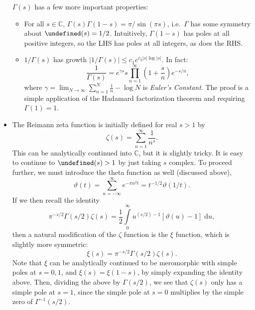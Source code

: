 \documentclass[11pt,
        usenames, %
        dvipsnames %
    ]{report}
\newcommand*{\abs}[1]{\left|#1\right|}
\newcommand*{\p}[1]{\left(#1\right)}
\newcommand*{\s}[1]{\left[#1\right]}
\let\Re\undefined
\DeclareMathOperator{\Re}{Re}
\begin{document}
\begin{itemize}
        $\Gamma(s)$ has a few more important properties:
        \begin{itemize}
            \item For all $s \in \mathbb{C}$, $\Gamma(s) \Gamma(1 - s) = \pi /
                \sin(\pi s)$, i.e.\ $\Gamma$ has some symmetry about $\Re(s) =
                1/2$. Intuitively, $\Gamma(1 - s)$ has poles at all positive
                integers, so the LHS has poles at all integers, as does the
                RHS\@.

            \item $1 / \Gamma(s)$ has growth $\abs{1 / \Gamma(s)} \leq
                c_1e^{c_2\abs{s}\log \abs{s}}$. In fact:
                \begin{equation}
                    \frac{1}{\Gamma(s)} = e^{\gamma s}s \prod_{n = 1}^\infty
                        \p{1 + \frac{s}{n}} e^{-s/n},
                \end{equation}
                where $\gamma = \lim_{N \to \infty} \sum\limits_{n = 1}^N
                \frac{1}{n} - \log N$ is \emph{Euler's Constant}. The proof is a
                simple application of the Hadamard factorization theorem and
                requiring $\Gamma(1) = 1$.
        \end{itemize}

    \item The Reimann zeta function is initially defined for real $s > 1$ by
        \begin{equation}
            \zeta(s) = \sum\limits_{n = 1}^\infty \frac{1}{n^s}.
        \end{equation}
        This can be analytically continued into $\mathbb{C}$, but it is slightly
        tricky. It is easy to continue to $\Re(s) > 1$ by just taking $s$
        complex. To proceed further, we must introduce the theta function as
        well (discussed above),
        \begin{equation}
            \vartheta(t) = \sum\limits_{n = -\infty}^\infty
                e^{-\pi n^2t} = t^{-1/2}\vartheta(1/t).
        \end{equation}
        If we then recall the identity
        \begin{equation}
            \pi^{-s/2}\Gamma\p{s/2} \zeta(s) = \frac{1}{2}\int\limits_0^\infty
                u^{(s/2) - 1}\s{\vartheta(u) - 1}\;\mathrm{d}u,
        \end{equation}
        then a natural modification of the $\zeta$ function is the $\xi$
        function, which is slightly more symmetric:
        \begin{equation}
            \xi(s) = \pi^{-s/2}\Gamma\p{s/2}\zeta(s).
        \end{equation}
        Note that $\xi$ can be analytically continued to be meromorphic with
        simple poles at $s = 0, 1$, and $\xi(s) = \xi(1 - s)$, by simply
        expanding the identity above. Then, dividing the above by $\Gamma\p{s /
        2}$, we see that $\zeta(s)$ only has a simple pole at $s = 1$, since the
        simple pole at $s = 0$ multiplies by the simple zero of $\Gamma^{-1}\p{s
        / 2}$.


\end{itemize}
\end{document}
